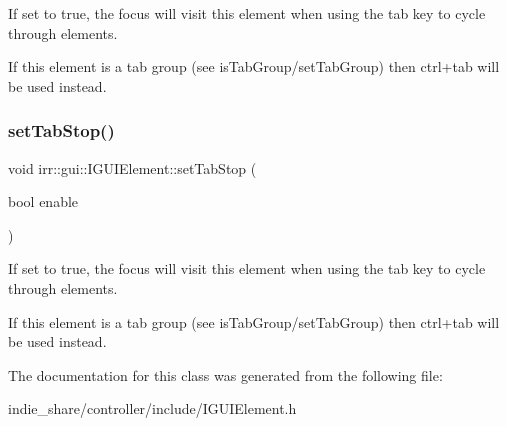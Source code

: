 If set to true, the focus will visit this element when using the tab key to cycle through elements. 

If this element is a tab group (see is\+Tab\+Group/set\+Tab\+Group) then ctrl+tab will be used instead. \mbox{\label{classirr_1_1gui_1_1IGUIElement_a58b9b6a8715b4959dda905dbc028ece6}} 
\subsubsection{\texorpdfstring{set\+Tab\+Stop()}{setTabStop()}\hspace{0.1cm}{\footnotesize\ttfamily [2/2]}}
{\footnotesize\ttfamily void irr\+::gui\+::\+I\+G\+U\+I\+Element\+::set\+Tab\+Stop (\begin{DoxyParamCaption}\item[{bool}]{enable }\end{DoxyParamCaption})\hspace{0.3cm}{\ttfamily [inline]}}



If set to true, the focus will visit this element when using the tab key to cycle through elements. 

If this element is a tab group (see is\+Tab\+Group/set\+Tab\+Group) then ctrl+tab will be used instead. 

The documentation for this class was generated from the following file\+:\begin{DoxyCompactItemize}
\item 
indie\+\_\+share/controller/include/I\+G\+U\+I\+Element.\+h\end{DoxyCompactItemize}
